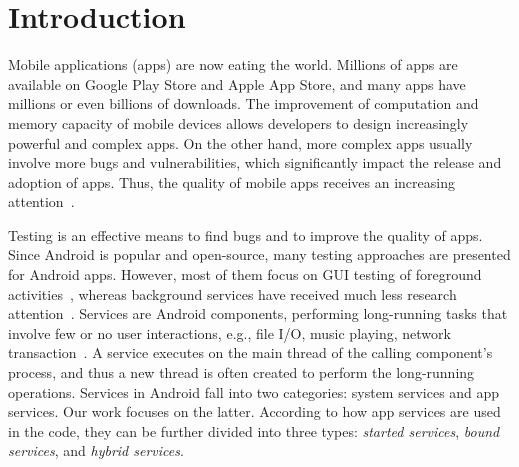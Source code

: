 \documentclass[sigconf,review, anonymous]{acmart}
\begin{document}



\maketitle

\section{Introduction}
Mobile applications (apps) are now eating the world. Millions of apps are available on Google Play Store and Apple App Store, and many apps have millions or even billions of downloads. The improvement of computation and memory capacity of mobile devices allows developers to design increasingly powerful and complex apps. On the other hand, more complex apps usually involve more bugs and vulnerabilities, which significantly impact the release and adoption of apps. Thus, the quality of mobile apps receives an increasing attention~\cite{ReavesBGABCDHKS16,AnandNHY12,MachiryTN13,ChoiNS13,LiuXC14,BanerjeeC0R14,LiuXCL14,HechtBRMD15,BehrouzSBM16,MirzaeiGBSM16,SuMCWYYPLS17}. 

Testing is an effective means to find bugs and to improve the quality of apps. Since Android is popular and open-source, many testing approaches are presented for Android apps. However, most of them focus on GUI testing of foreground activities~\cite{monkey,AnandNHY12,MachiryTN13,ChoiNS13,MirzaeiGBSM16,BaekB16,SuMCWYYPLS17,SongQH17}, whereas background services have received much less research attention~\cite{ZhangLLC17}. Services are Android components, performing long-running tasks that involve few or no user interactions, e.g., file I/O, music playing, network transaction~\cite{Androidservice}. A service executes on the main thread of the calling component's process, and thus a new thread is often created to perform the long-running operations. Services in Android fall into two categories: system services and app services. Our work focuses on the latter. According to how app services are used in the code, they can be further divided into three types: \textit{started services}, \textit{bound services}, and \textit{hybrid services}.
\end{document}
